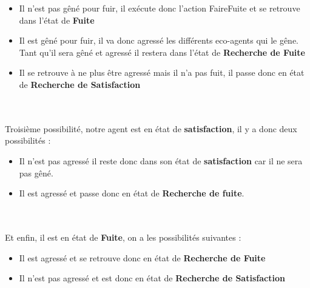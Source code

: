 \begin{itemize}
\item Il n'est pas gêné pour fuir, il exécute donc l'action FaireFuite et se retrouve dans l'état de \textbf{Fuite}
\item Il est gêné pour fuir, il va donc agressé les différents eco-agents qui le gêne. Tant qu'il sera gêné et agressé il restera dans l'état de \textbf{Recherche de Fuite}
\item Il se retrouve à ne plus être agressé mais il n'a pas fuit, il passe donc en état de \textbf{Recherche de Satisfaction} 
\end{itemize}~\\
~\\
Troisième possibilité, notre agent est en état de \textbf{satisfaction}, il y a donc deux possibilités :\\
\begin{itemize}
\item Il n'est pas agressé il reste donc dans son état de \textbf{satisfaction} car il ne sera pas gêné.
\item Il est agressé et passe donc en état de \textbf{Recherche de fuite}. 
\end{itemize}~\\
~\\
Et enfin, il est en état de \textbf{Fuite}, on a les possibilités suivantes :\\
\begin{itemize}
\item Il est agressé et se retrouve donc en état de \textbf{Recherche de Fuite}
\item Il n'est pas agressé et est donc en état de \textbf{Recherche de Satisfaction}
\end{itemize}